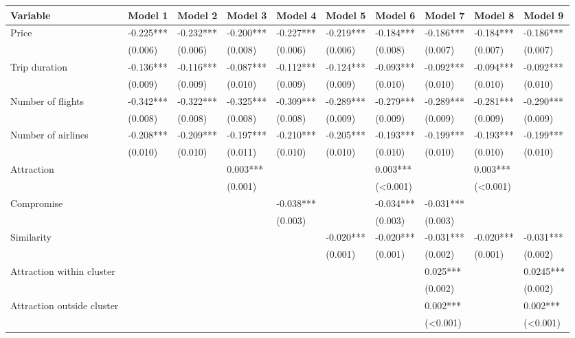\documentclass[a4paper,12pt]{article}
\begin{document}
\clearpage

\begin{table}
\centering
\begin{tabular}{p{5cm}|*{9}{p{1.7cm}}}
\hline
Variable & Model 1 & Model 2 & Model 3 & Model 4 & Model 5 & Model 6 & Model 7 & Model 8 & Model 9 \\ \hline
Price & -0.225*** & -0.232*** & -0.200*** & -0.227*** & -0.219*** & -0.184*** & -0.186*** & -0.184*** & -0.186*** \\ 
 & (0.006) & (0.006) & (0.008) & (0.006) & (0.006) & (0.008) & (0.007) & (0.007) & (0.007) \\ 
Trip duration & -0.136*** & -0.116*** & -0.087*** & -0.112*** & -0.124*** & -0.093*** & -0.092*** & -0.094*** & -0.092*** \\
 & (0.009) & (0.009) & (0.010) & (0.009) & (0.009) & (0.010) & (0.010) & (0.010) & (0.010) \\ 
Number of flights & -0.342*** & -0.322*** & -0.325*** & -0.309*** & -0.289*** & -0.279*** & -0.289*** & -0.281*** & -0.290*** \\ 
 & (0.008) & (0.008) & (0.008) & (0.008) & (0.009) & (0.009) & (0.009) & (0.009) & (0.009) \\
Number of airlines & -0.208*** & -0.209*** & -0.197*** & -0.210*** & -0.205*** & -0.193*** & -0.199*** & -0.193*** & -0.199*** \\
 & (0.010) & (0.010) & (0.011) & (0.010) & (0.010) & (0.010) & (0.010) & (0.010) & (0.010) \\ 
Attraction &  &  & 0.003*** &  &  & 0.003*** &  & 0.003*** &  \\ 
 &  &  & (0.001) &  &  & (<0.001) &  & (<0.001) &  \\ 
Compromise &  &  &  & -0.038*** &  & -0.034*** & -0.031*** &  &  \\ 
 &  &  &  & (0.003) &  & (0.003) & (0.003) &  &  \\ 
Similarity &  &  &  &  & -0.020*** & -0.020*** & -0.031*** & -0.020*** & -0.031*** \\ 
 &  &  &  &  & (0.001) & (0.001) & (0.002) & (0.001) & (0.002) \\ 
Attraction within cluster &  &  &  &  &  &  & 0.025*** &  & 0.0245*** \\ 
 &  &  &  &  &  &  & (0.002) &  & (0.002) \\ 
Attraction outside cluster &  &  &  &  &  &  & 0.002*** &  & 0.002*** \\ 
 &  &  &  &  &  &  & (<0.001) &  & (<0.001) \\ 

\end{tabular}
\end{table}
\end{document}
